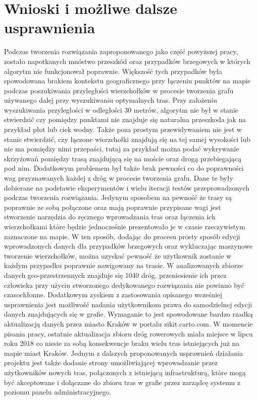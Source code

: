 \chapter{Wnioski i możliwe dalsze usprawnienia}
\label{cha:wnioski}

Podczas tworzenia rozwiązania zaproponowanego jako część powyższej pracy, zostało napotkanych mnóstwo przeszkód oraz przypadków brzegowych w których algorytm nie funkcjonował poprawnie. Większość tych przypadków była spowodowana brakiem kontekstu geograficznego przy łączeniu punktów na mapie podczas poszukiwania przyległości wierzchołków w procesie tworzenia grafu używanego dalej przy wyszukiwaniu optymalnych tras. Przy założeniu wyszukiwania przyległości w odległości 30 metrów, algorytm nie był w stanie stwierdzić czy pomiędzy punktami nie znajduje się naturalna przeszkoda jak na przykład płot lub ciek wodny. Także poza prostym przewidywaniem nie jest w stanie stwierdzić, czy łączone wierzchołki znajdują się na tej samej wysokości lub nie ma pomiędzy nimi przepaści, tutaj za przykład można podać wykrywanie skrzyżowań pomiędzy trasą znajdującą się na moście oraz drogą przebiegającą pod nim. Dodatkowym problemem był także brak pewności co do poprawności wag przyznawanych każdej z dróg w procesie tworzenia grafu. Dane te były dobierane na podstawie eksperymentów i wielu iteracji testów przeprowadzonych podczas tworzenia rozwiązania. \newline
Jedynym sposobem na pewność że trasy są poprawnie ze sobą połączone oraz mają poprawnie przypisane wagi jest stworzenie narzędzia do ręcznego wprowadzania tras oraz łączenia ich wierzchołkami które będzie jednocześnie prezentowało je w czasie rzeczywistym zaznaczone na mapie. W ten sposób, dodając do procesu prosty sposób edycji wprowadzonych danych dla przypadków brzegowych oraz wykluczając maszynowe tworzenie wierzchołków, można uzyskać pewność że użytkownik zostanie w każdym przypadku poprawnie nawigowany na trasie. W analizowanych zbiorze danych geo-przestrzennych znajduje się 1040 dróg, przeniesienie ich przez człowieka przy użyciu stworzonego dedykowanego rozwiązania nie powinno być czasochłonne. \newline
Dodatkowym zyskiem z zastosowania opisanego wcześniej usprawnienia jest możliwość nadania użytkownikom prawa do samodzielnej edycji danych znajdujących się w grafie. Wymaganie to jest spowodowane bardzo rzadką aktualizacją danych przez miasto Kraków w portalu zikit.carto.com. W momencie pisania pracy, ostatnie aktualizacja zbioru dróg rowerowych miała miejsce w lipcu roku 2018 co niesie za sobą konsekwencje braku wielu tras istniejących już na mapie miast Kraków. Jednym z dalszych proponowanych usprawnień działania projektu jest także dodanie strony umożliwiającej wprowadzanie przez użytkowników nowych tras, połączonych z istniejącą infrastrukturą, które mogą być akceptowane i dołączane do zbioru tras w grafie przez zarządcę systemu z poziomu panelu administracyjnego. \newline
